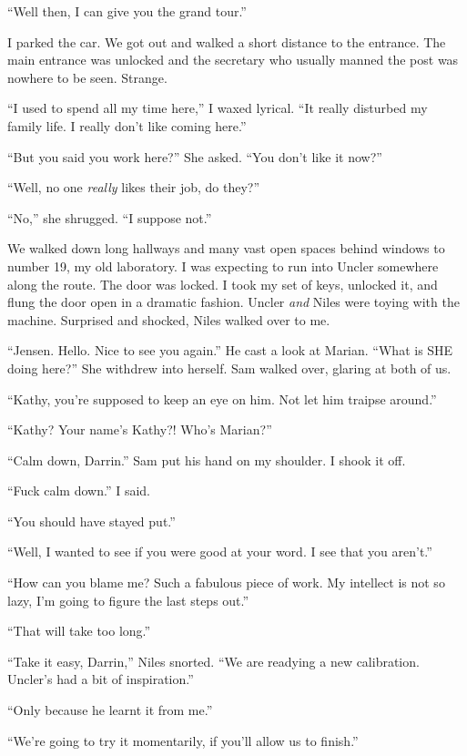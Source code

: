 \documentclass[
]{article}
\begin{document}
``Well then, I can give you the grand tour.''

I parked the car. We got out and walked a short distance to the
entrance. The main entrance was unlocked and the secretary who usually
manned the post was nowhere to be seen. Strange.

``I used to spend all my time here,'' I waxed lyrical. ``It really
disturbed my family life. I really don't like coming here.''

``But you said you work here?'' She asked. ``You don't like it now?''

``Well, no one \emph{really} likes their job, do they?''

``No,'' she shrugged. ``I suppose not.''

We walked down long hallways and many vast open spaces behind windows to
number 19, my old laboratory. I was expecting to run into Uncler
somewhere along the route. The door was locked. I took my set of keys,
unlocked it, and flung the door open in a dramatic fashion. Uncler
\emph{and} Niles were toying with the machine. Surprised and shocked,
Niles walked over to me.

``Jensen. Hello. Nice to see you again.'' He cast a look at Marian.
``What is SHE doing here?'' She withdrew into herself. Sam walked over,
glaring at both of us.

``Kathy, you're supposed to keep an eye on him. Not let him traipse
around.''

``Kathy? Your name's Kathy?! Who's Marian?''

``Calm down, Darrin.'' Sam put his hand on my shoulder. I shook it off.

``Fuck calm down.'' I said.

``You should have stayed put.''

``Well, I wanted to see if you were good at your word. I see that you
aren't.''

``How can you blame me? Such a fabulous piece of work. My intellect is
not so lazy, I'm going to figure the last steps out.''

``That will take too long.''

``Take it easy, Darrin,'' Niles snorted. ``We are readying a new
calibration. Uncler's had a bit of inspiration.''

``Only because he learnt it from me.''

``We're going to try it momentarily, if you'll allow us to finish.''
\end{document}
